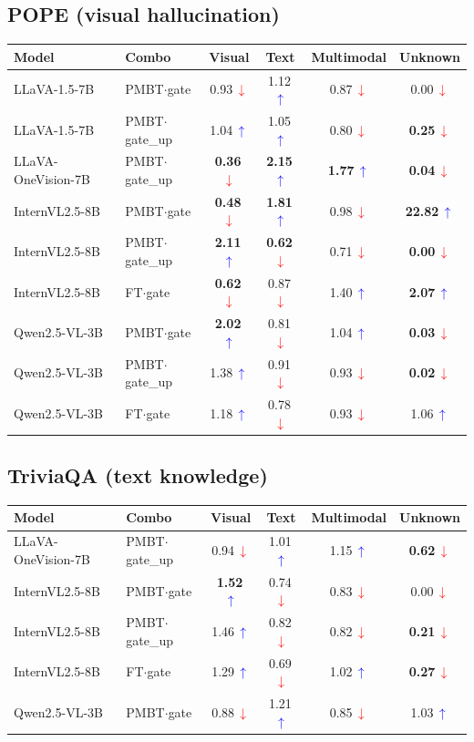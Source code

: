 \documentclass[11pt,a4paper]{article}
\newcommand{\up}{\,\textcolor{blue}{$\uparrow$}}
\newcommand{\dn}{\,\textcolor{red}{$\downarrow$}}
\begin{document}
\subsection*{POPE (visual hallucination)}
\begin{center}
\begin{tabular}{l l c c c c}
\toprule
Model & Combo & Visual & Text & Multimodal & Unknown \\
\midrule
LLaVA-1.5-7B & PMBT$\cdot$gate & 0.93\dn & 1.12\up & 0.87\dn & 0.00\dn \\
LLaVA-1.5-7B & PMBT$\cdot$gate\_up & 1.04\up & 1.05\up & 0.80\dn & \textbf{0.25\dn} \\
LLaVA-OneVision-7B & PMBT$\cdot$gate\_up & \textbf{0.36\dn} & \textbf{2.15\up} & \textbf{1.77\up} & \textbf{0.04\dn} \\
InternVL2.5-8B & PMBT$\cdot$gate & \textbf{0.48\dn} & \textbf{1.81\up} & 0.98\dn & \textbf{22.82\up} \\
InternVL2.5-8B & PMBT$\cdot$gate\_up & \textbf{2.11\up} & \textbf{0.62\dn} & 0.71\dn & \textbf{0.00\dn} \\
InternVL2.5-8B & FT$\cdot$gate & \textbf{0.62\dn} & 0.87\dn & 1.40\up & \textbf{2.07\up} \\
Qwen2.5-VL-3B & PMBT$\cdot$gate & \textbf{2.02\up} & 0.81\dn & 1.04\up & \textbf{0.03\dn} \\
Qwen2.5-VL-3B & PMBT$\cdot$gate\_up & 1.38\up & 0.91\dn & 0.93\dn & \textbf{0.02\dn} \\
Qwen2.5-VL-3B & FT$\cdot$gate & 1.18\up & 0.78\dn & 0.93\dn & 1.06\up \\
\bottomrule
\end{tabular}
\end{center}

\subsection*{TriviaQA (text knowledge)}
\begin{center}
\begin{tabular}{l l c c c c}
\toprule
Model & Combo & Visual & Text & Multimodal & Unknown \\
\midrule
LLaVA-OneVision-7B & PMBT$\cdot$gate\_up & 0.94\dn & 1.01\up & 1.15\up & \textbf{0.62\dn} \\
InternVL2.5-8B & PMBT$\cdot$gate & \textbf{1.52\up} & 0.74\dn & 0.83\dn & 0.00\dn \\
InternVL2.5-8B & PMBT$\cdot$gate\_up & 1.46\up & 0.82\dn & 0.82\dn & \textbf{0.21\dn} \\
InternVL2.5-8B & FT$\cdot$gate & 1.29\up & 0.69\dn & 1.02\up & \textbf{0.27\dn} \\
Qwen2.5-VL-3B & PMBT$\cdot$gate & 0.88\dn & 1.21\up & 0.85\dn & 1.03\up \\
\bottomrule
\end{tabular}
\end{center}
\end{document}
